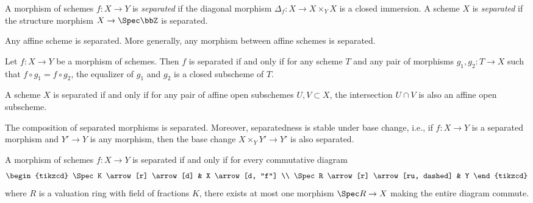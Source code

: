    \begin{definition}\label{def:separated_morphism_and_separated_scheme}
        A morphism of schemes \(f : X \to Y\) is \emph{separated} if the diagonal morphism \(\Delta_f : X \to X \times_Y X\) is a closed immersion.
        A scheme \(X\) is \emph{separated} if the structure morphism \(X \to \Spec \bbZ\) is separated.
    \end{definition}

    \begin{proposition}\label{prop:affine_scheme_is_separated}
        Any affine scheme is separated.
        More generally, any morphism between affine schemes is separated.
    \end{proposition}

    \begin{proposition}\label{prop:separatedness_and_rigidity_of_morphisms}
        Let \(f : X \to Y\) be a morphism of schemes.
        Then \(f\) is separated if and only if for any scheme \(T\) and any pair of morphisms \(g_1, g_2 : T \to X\) such that \(f \circ g_1 = f \circ g_2\),
        the equalizer of \(g_1\) and \(g_2\) is a closed subscheme of \(T\).
    \end{proposition}

    \begin{proposition}\label{prop:separatedness_and_intersection_of_affine_open_subschemes}
        A scheme \(X\) is separated if and only if for any pair of affine open subschemes \(U, V \subset X\), the intersection \(U \cap V\) is also an affine open subscheme.
    \end{proposition}

    \begin{proposition}\label{prop:composition_and_base_change_of_separated_morphisms}
        The composition of separated morphisms is separated.
        Moreover, separatedness is stable under base change, i.e., if \(f : X \to Y\) is a separated morphism and \(Y' \to Y\) is any morphism, then the base change \(X \times_Y Y' \to Y'\) is also separated.
        
    \end{proposition}

    \begin{proposition}\label{prop:valuative_criterion_of_separatedness}
        A morphism of schemes \(f : X \to Y\) is separated if and only if for every commutative diagram
        \[
            \begin{tikzcd}
                \Spec K \arrow[r] \arrow[d] & X \arrow[d, "f"] \\
                \Spec R \arrow[r] \arrow[ru, dashed] & Y
            \end{tikzcd}
        \]
        where \(R\) is a valuation ring with field of fractions \(K\), there exists at most one morphism \(\Spec R \to X\) making the entire diagram commute.
    \end{proposition}

